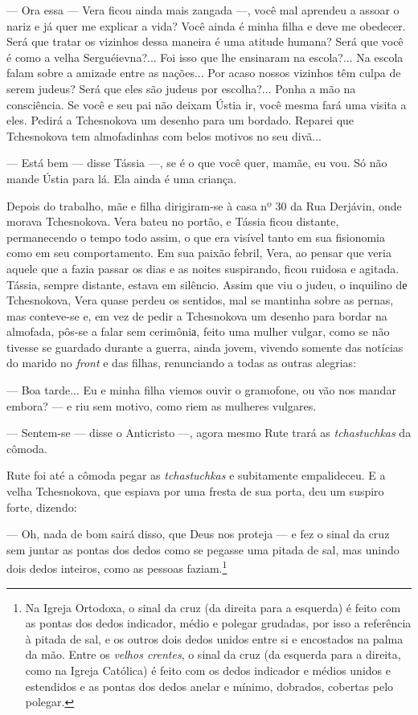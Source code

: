--- Ora essa --- Vera ficou ainda mais zangada ---, você mal aprendeu a
assoar o nariz e já quer me explicar a vida? Você ainda é minha filha e
deve me obedecer. Será que tratar os vizinhos dessa maneira é uma
atitude humana? Será que você é como a velha Serguéievna?... Foi isso
que lhe ensinaram na escola?... Na escola falam sobre a amizade entre as
nações... Por acaso nossos vizinhos têm culpa de serem judeus? Será que
eles são judeus por escolha?... Ponha a mão na consciência. Se você e
seu pai não deixam Ústia ir, você mesma fará uma visita a eles. Pedirá a
Tchesnokova um desenho para um bordado. Reparei que Tchesnokova tem
almofadinhas com belos motivos no seu divã...

--- Está bem --- disse Tássia ---, se é o que você quer, mamãe, eu vou.
Só não mande Ústia para lá. Ela ainda é uma criança.

Depois do trabalho, mãe e filha dirigiram-se à casa nº 30 da Rua
Derjávin, onde morava Tchesnokova. Vera bateu no portão, e Tássia ficou
distante, permanecendo o tempo todo assim, o que era visível tanto em
sua fisionomia como em seu comportamento. Em sua paixão febril, Vera, ao
pensar que veria aquele que a fazia passar os dias e as noites
suspirando, ficou ruidosa e agitada. Tássia, sempre distante, estava em
silêncio. Assim que viu o judeu, o inquilino dе Tchesnokova, Vera quase
perdeu os sentidos, mal se mantinha sobre as pernas, mas conteve-se e,
em vez de pedir a Tchesnokova um desenho para bordar na almofada, pôs-se
a falar sem cerimôniа, feito uma mulher vulgar, como se não tivesse se
guardado durante a guerra, ainda jovem, vivendo somente das notícias do
marido no \emph{front} e das filhas, renunciando a todas as outras
alegrias:

--- Boa tarde... Eu e minha filha viemos ouvir o gramofone, ou vão nos
mandar embora? --- e riu sem motivo, como riem as mulheres vulgares.

--- Sentem-se --- disse o Anticristo ---, agora mesmo Rute trará as
\emph{tchastuchkas} da cômoda.

Rute foi até a cômoda pegar as \emph{tchastuchkas} e subitamente
empalideceu. E a velha Tchesnokova, que espiava por uma fresta de sua
porta, deu um suspiro forte, dizendo:

--- Oh, nada de bom sairá disso, que Deus nos proteja --- e fez o sinal
da cruz sem juntar as pontas dos dedos como se pegasse uma pitada de
sal, mas unindo dois dedos inteiros, como as pessoas faziam.\footnote{Na
  Igreja Ortodoxa, o sinal da cruz (da direita para a esquerda) é feito
  com as pontas dos dedos indicador, médio e polegar grudadas, por isso
  a referência à pitada de sal, e os outros dois dedos unidos entre si e
  encostados na palma da mão. Entre os \emph{velhos crentes}, o sinal da
  cruz (da esquerda para a direita, como na Igreja Católica) é feito com
  os dedos indicador e médios unidos e estendidos e as pontas dos dedos
  anelar e mínimo, dobrados, cobertas pelo polegar.}

